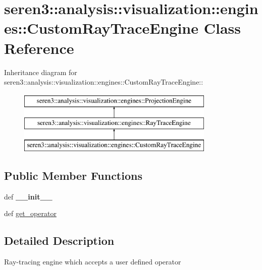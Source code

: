 \hypertarget{classseren3_1_1analysis_1_1visualization_1_1engines_1_1CustomRayTraceEngine}{
\section{seren3::analysis::visualization::engines::CustomRayTraceEngine Class Reference}
\label{classseren3_1_1analysis_1_1visualization_1_1engines_1_1CustomRayTraceEngine}
}
Inheritance diagram for seren3::analysis::visualization::engines::CustomRayTraceEngine::\begin{figure}[H]
\begin{center}
\leavevmode
\includegraphics[height=3cm]{classseren3_1_1analysis_1_1visualization_1_1engines_1_1CustomRayTraceEngine}
\end{center}
\end{figure}
\subsection*{Public Member Functions}
\begin{DoxyCompactItemize}
\item 
\hypertarget{classseren3_1_1analysis_1_1visualization_1_1engines_1_1CustomRayTraceEngine_aaa5d081c9eff27199c2549c224789b98}{
def {\bfseries \_\-\_\-init\_\-\_\-}}
\label{classseren3_1_1analysis_1_1visualization_1_1engines_1_1CustomRayTraceEngine_aaa5d081c9eff27199c2549c224789b98}

\item 
def \hyperlink{classseren3_1_1analysis_1_1visualization_1_1engines_1_1CustomRayTraceEngine_ac72e1e31d092afc79e0e910f9b25022d}{get\_\-operator}
\end{DoxyCompactItemize}


\subsection{Detailed Description}
\begin{DoxyVerb}
Ray-tracing engine which accepts a user defined operator
\end{DoxyVerb}
 


